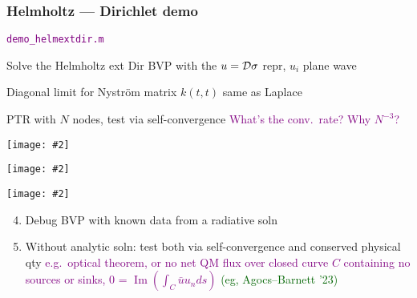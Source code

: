 \documentclass[t]{beamer}
\newcommand{\ft}[1]{\frametitle{#1}}
\newcommand{\ben}{\begin{enumerate}}
\newcommand{\een}{\end{enumerate}}
\newcommand{\who}[1]{{\scriptsize \textcolor{darkgreen}{(#1)}}}  %
\newcommand{\com}[1]{{\scriptsize \textcolor{purple}{#1}}}      %
\newcommand{\sg}{\vspace{1ex}}
\newcommand{\bmp}[1]{\begin{minipage}{#1}}
\newcommand{\emp}{\end{minipage}}
\newcommand{\pig}[2]{\bmp{#1}\texttt{[image: \#2]}\emp} %
\DeclareMathOperator{\im}{Im}
\newcommand{\Drep}{{\cal D}}
\begin{document}
\begin{frame}\ft{Helmholtz --- Dirichlet demo}
\vspace{-5ex}
\hfill\com{{\tt demo\_helmextdir.m}}

    \vspace{5ex}
    Solve the Helmholtz ext Dir BVP with the $u = \Drep \sigma$ repr, $u_i$ plane wave
    \sg 

    Diagonal limit for Nystr\"{o}m matrix $k(t, t)$ same as Laplace
    \sg 

    PTR with $N$ nodes, test via self-convergence \com{What's the conv.\ rate?} \com{ Why $N^{-3}$?}

\sg

\pause
\vspace{5pt}
\pig{1.4in}{helmextdir}
\hfill
\pig{1.3in}{helmextdir_conv}
\hfill
\pause
\pig{1.3in}{helmextdir_err}

  
  \ben
\setcounter{enumi}{3}
  \item Debug BVP with known data from a radiative soln \;\com{sources inside $\Omega$}
  \item Without analytic soln: test both via self-convergence and conserved physical qty \com{e.g.\ optical theorem, or no net QM flux over closed curve $C$ containing no sources or sinks, 0 = $\im \left( \int_{C} \bar{u}u_n ds \right)$ \who{eg, Agocs--Barnett '23}}
\een


\end{frame}
\end{document}
